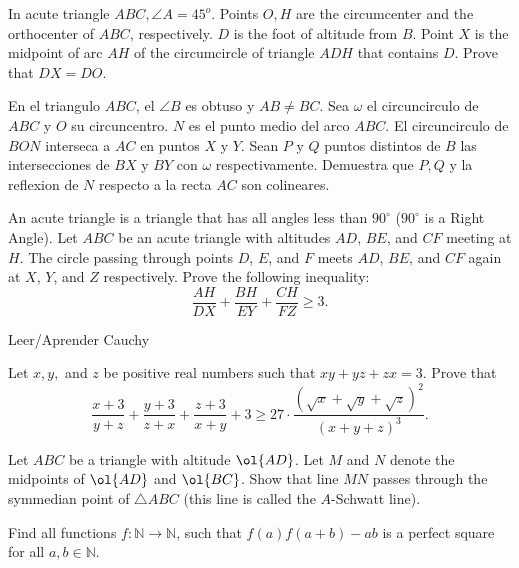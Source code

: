 \documentclass[11pt]{scrartcl}
\begin{document}
\begin{problem}
	In acute triangle $ABC, \angle A = 45^o$. Points $O,H$ are the circumcenter and the orthocenter of $ABC$, respectively. $D$ is the foot of altitude from $B$. Point $X$ is the midpoint of arc $AH$ of the circumcircle of triangle $ADH$ that contains $D$. Prove that $DX = DO$.
\end{problem}
\begin{problem}
En el triangulo $ABC$, el $\angle B$ es obtuso y $AB \neq BC$. Sea $\omega$ el circuncirculo de $ABC$ y $O$ su circuncentro. $N$ es el punto medio del arco $ABC$. El circuncirculo de $BON$ interseca a $AC$ en puntos $X$ y $Y$. Sean $P$ y $Q$ puntos distintos de $B$ las intersecciones de $BX$ y $BY$ con $\omega$ respectivamente. Demuestra que $P,Q$ y la reflexion de $N$ respecto a la recta $AC$ son colineares.  
\end{problem}
\begin{problem}[Canada 2023/3]
    An acute triangle is a triangle that has all angles less than $90^{\circ}$ ($90^{\circ}$ is a Right Angle). Let $ABC$ be an acute triangle with altitudes $AD$, $BE$, and $CF$ meeting at $H$. The circle passing through points $D$, $E$, and $F$ meets $AD$, $BE$, and $CF$ again at $X$, $Y$, and $Z$ respectively. Prove the following inequality:$$\frac{AH}{DX}+\frac{BH}{EY}+\frac{CH}{FZ} \geq 3.$$
\end{problem}
\begin{problem}
Leer/Aprender Cauchy
\end{problem}
\begin{problem}
Let $x, y,$ and $z$ be positive real numbers such that $xy + yz + zx = 3$. Prove that
$$\frac{x + 3}{y + z} + \frac{y + 3}{z + x} + \frac{z + 3}{x + y} + 3 \ge 27 \cdot \frac{(\sqrt{x} + \sqrt{y} + \sqrt{z})^2}{(x + y + z)^3}.$$
\end{problem}
\begin{problem}
  Let $ABC$ be a triangle with altitude $\ol{AD}$.
  Let $M$ and $N$ denote the midpoints of $\ol{AD}$ and $\ol{BC}$.
  Show that line $MN$ passes through
  the symmedian point of $\triangle ABC$
  (this line is called the $A$-Schwatt line).
\end{problem}
\begin{problem}
	Find all functions $f:\mathbb{N} \rightarrow \mathbb{N}$, such that $f(a)f(a+b)-ab$ is a perfect square for all $a, b \in \mathbb{N}$.
\end{problem}
\end{document}
